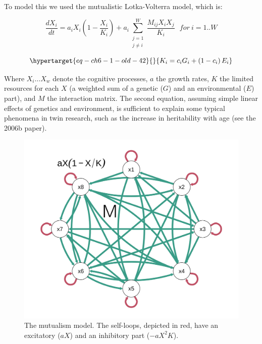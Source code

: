 \documentclass[
  a4paper,
  DIV=11,
  numbers=noendperiod,
  oneside]{scrreprt}
\begin{document}
To model this we used the mutualistic Lotka-Volterra model, which is:

\[\frac{dX_{i}}{dt} = a_{i}X_{i}\left( 1 - \frac{X_{i}}{K_{i}} \right) + a_{i}\sum_{\begin{array}{r}
j = 1 \\
j \neq i
\end{array}}^{W}\frac{M_{ij}X_{i}X_{j}}{K_{i}}\ \ \ for\ i = 1..W\]

\begin{equation}\protect\hypertarget{eq-ch6-1-old-42}{}{
K_{i} = c_{i}G_{i} + \left( 1 - c_{i} \right)E_{i}
}\label{eq-ch6-1-old-42}\end{equation}

Where \(X_{i} \ldots X_{w}\) denote the cognitive processes, \(a\) the
growth rates, \(K\) the limited resources for each \(X\) (a weighted sum
of a genetic (\(G\)) and an environmental (\(E\)) part), and \(M\) the
interaction matrix. The second equation, assuming simple linear effects
of genetics and environment, is sufficient to explain some typical
phenomena in twin research, such as the increase in heritability with
age (see the 2006b paper).

\begin{figure}

{\centering \includegraphics{media/ch6/fig-ch6-img6-old-75.png}

}

\caption{\label{fig-ch6-img6-old-75}The mutualism model. The self-loops,
depicted in red, have an excitatory (\(aX\)) and an inhibitory part
(\(- aX^{2}K\)).}

\end{figure}
\end{document}
